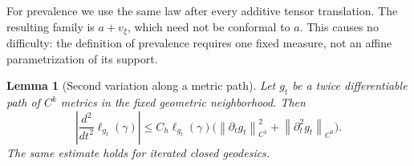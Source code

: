 \documentclass[10pt,oneside,reqno]{amsproc}
\numberwithin{equation}{section}
\newtheorem{lemma}[theorem]{Lemma}
\theoremstyle{definition}
\theoremstyle{remark}
\newcommand{\norm}[1]{\left\|#1\right\|}
\renewcommand{\le}{\leqslant}
\begin{document}
For prevalence we use the same law after every additive tensor translation. The resulting family is $a+v_\xi$, which need not be conformal to $a$. This causes no difficulty: the definition of prevalence requires one fixed measure, not an affine parametrization of its support.


\begin{lemma}[Second variation along a metric path]
\label{prob:second-variation}
Let $g_t$ be a twice differentiable path of $C^k$ metrics in the fixed geometric neighborhood. Then
\begin{equation}
 \left|\frac{d^2}{dt^2}\ell_{g_t}(\gamma)\right|\le C_h\ell_{g_t}(\gamma)\bigl(\norm{\partial_tg_t}_{C^1}^2+\norm{\partial_t^2g_t}_{C^0}\bigr).
 \label{prob:hessian}
\end{equation}
The same estimate holds for iterated closed geodesics.
\end{lemma}
\end{document}
